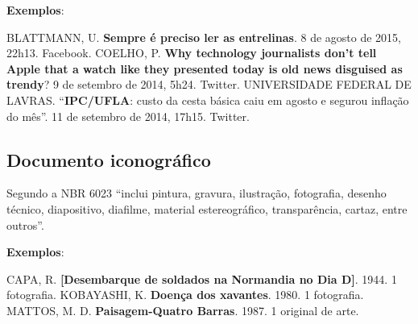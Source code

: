 \begin{exemplomanual}
\textbf{Exemplos}:\\
\begin{singlespace}
BLATTMANN, U. \textbf{Sempre é preciso ler as entrelinas}. 8 de agosto de 2015, 22h13. Facebook.
\newline
\newline
COELHO, P. \textbf{Why technology journalists don't tell Apple that a watch like they presented today is old news disguised as trendy}? 9 de setembro de 2014, 5h24. Twitter.
\newline
\newline
UNIVERSIDADE FEDERAL DE LAVRAS. ``\textbf{IPC/UFLA}: custo da cesta básica caiu em agosto e segurou inflação do mês''. 11 de setembro de 2014, 17h15. Twitter.
\end{singlespace}
\end{exemplomanual}


\subsection{Documento iconográfico}

Segundo a NBR 6023 \cite[p.11]{NBR6023:2002} ``inclui pintura, gravura, ilustração, fotografia, desenho técnico, diapositivo, diafilme, material estereográfico, transparência, cartaz, entre outros''.

\begin{flushleft}
\begin{singlespace}
\end{singlespace}
\end{flushleft}

\begin{exemplomanual}
\textbf{Exemplos}:\\
\begin{singlespace}
CAPA, R. \textbf{[Desembarque de soldados na Normandia no Dia D]}. 1944. 1 fotografia.
\newline
\newline
KOBAYASHI, K. \textbf{Doença dos xavantes}. 1980. 1 fotografia.
\newline
\newline
MATTOS, M. D. \textbf{Paisagem-Quatro Barras}. 1987. 1 original de arte.
\end{singlespace}
\end{exemplomanual}


